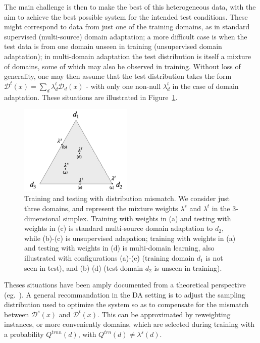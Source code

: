 \documentclass[11pt,a4paper]{article}
\begin{document}
The main challenge is then to make the best of this heterogeneous data, with the aim to achieve the best possible system for the intended test conditions. These might correspond to data from just one of the training domains, as in standard supervised (multi-source) domain adaptation; a more difficult case is when the test data is from one domain unseen in training (unsupervised domain adaptation); in multi-domain adaptation the test distribution is itself a mixture of domains, some of which may also be observed in training.  Without loss of generality, one may then assume that the test distribution takes the form $\mathcal{D}^t(x) = \sum_d \lambda^{t}_{d} \mathcal{D}_d(x)$ - with only one non-null  $\lambda^{t}_{d}$ in the case of domain adaptation.
These situations are illustrated in Figure~\ref{fig:mdmt-lambdas}.
\begin{figure}[h]
  \centering
  \includegraphics[width=0.48\textwidth]{mdmt-lambdas}
  \caption{Training and testing with distribution mismatch. We consider just three domains, and represent the mixture weights $\lambda^{s}$ and $\lambda^{t}$ in the 3-dimensional simplex. Training with weights in (a) and testing with weights in (c) is standard multi-source domain adaptation to $d_2$, while (b)-(c) is unsupervised adapation; training with weights in (a) and testing with weights in (d) is multi-domain learning, also illustrated with configurations (a)-(e) (training domain $d_1$ is not seen in test), and (b)-(d)  (test domain $d_2$ is unseen in training).}\label{fig:mdmt-lambdas}
\end{figure}

Theses situations have been amply documented from a theoretical perspective (eg.\ \cite{Mansour09multiple,Mansour09domainadaptation,Hoffman18algorithms}). A general recommandation in the DA setting  is to adjust the sampling distribution used to optimize the system so as to compensate for the mismatch between $\mathcal{D}^s(x)$ and $\mathcal{D}^t(x)$. This can be approximated by reweighting instances, or more conveniently domains, which are selected during training with a probability $Q^{trnn}(d)$, with $Q^{trn}(d) \neq \lambda^{s}(d)$.
\end{document}
